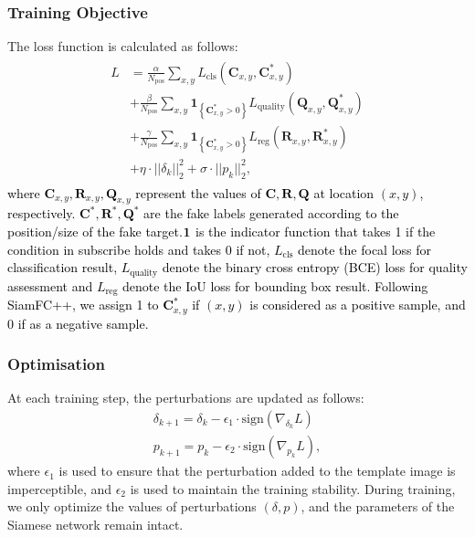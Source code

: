\documentclass{article}
\begin{document}
\subsubsection{Training Objective}

The loss function is calculated as follows:
\begin{equation}
\begin{array}{l}
\begin{aligned}
L&=\frac{\alpha}{N_{\mathrm{pos}}} \sum_{x, y} L_{\mathrm{cls}}\left(\textbf{C}_{x, y}, \textbf{C}_{x, y}^{*}\right) \\
&+\frac{\beta}{N_{\mathrm{pos}}} \sum_{x, y} \textbf{1}_{\left\{\textbf{C}_{x, y}^{*}>0\right\}} L_{\mathrm{quality}}\left(\textbf{Q}_{x, y}, \textbf{Q}_{x, y}^{*}\right) \\
&+\frac{\gamma}{N_{\mathrm{pos}}} \sum_{x, y} \textbf{1}_{\left\{\textbf{C}_{x, y}^{*}>0\right\}} L_{\mathrm{reg}}\left(\textbf{R}_{x, y}, \textbf{R}_{x, y}^{*}\right) \\
&+\eta \cdot ||\delta_k||_2^2 +  \sigma \cdot ||p_k||^2_2,
\end{aligned}
\end{array}
\label{eq:loss}
\end{equation}
\textcolor{black} %
{where $\textbf{C}_{x, y}, \textbf{R}_{x, y}, \textbf{Q}_{x, y}$ represent the values of $\textbf{C}, \textbf{R}, \textbf{Q}$ at location $(x, y)$, respectively. $\textbf{C}^*, \textbf{R}^*, \textbf{Q}^*$ are the fake labels generated according to the position/size of the fake target.$\textbf 1$ is the indicator function that takes 1 if the condition in subscribe holds and takes 0 if not, $L_{\mathrm{cls}}$ denote the focal loss \cite{focal} for classification result, $L_{\mathrm{quality}}$ denote the binary cross entropy (BCE) loss for quality assessment and $L_{\mathrm{reg}}$ denote the IoU loss \cite{iou-loss} for bounding box result. Following SiamFC++, we assign 1 to $\textbf{C}_{x, y}^{*}$ if $(x, y)$ is considered as a positive sample, and 0 if as a negative sample.}

\subsubsection{Optimisation}

At each training step, the perturbations are updated as follows:
\begin{gather}
\delta_{k+1} = \delta_{k} - \epsilon_1 \cdot \text{sign}(\nabla_{\delta_k}L)\\
p_{k+1} = p_{k} - \epsilon_2 \cdot \text{sign}(\nabla_{p_k}L),
\end{gather}
where $\epsilon_1$ is used to ensure that the perturbation added to the template image is imperceptible, and $\epsilon_2$ is used to maintain the training stability.
During training, we only optimize the values of perturbations $(\delta, p)$, and the parameters of the Siamese network remain intact.
\end{document}
